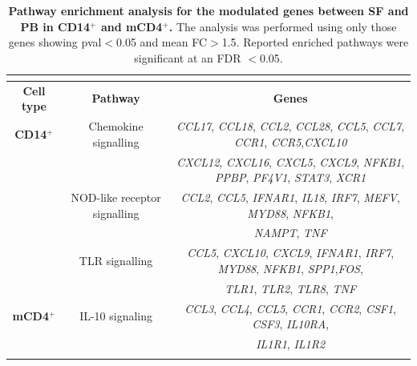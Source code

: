 \begin{landscape}
\begin{center}
\begin{longtable}[ht]{c c c }
\caption[Pathway enrichment analysis for the modulated genes between SF and PB in CD14$^+$ and mCD4$^+$.]{\textbf{Pathway enrichment analysis for the modulated genes between SF and PB in CD14$^+$ and mCD4$^+$.} The analysis was performed using only those genes showing pval$<$0.05 and mean FC$>$1.5. Reported enriched pathways were significant at an FDR $<$0.05.}
\\
\label{table:PSA_PCR_array_pathway_analysis} \\
\toprule
\textbf{Cell type} & \textbf{Pathway} & \textbf{Genes} \\						
\midrule
\midrule
\textbf{CD14$^+$} & Chemokine signalling & \textit{CCL17}, \textit{CCL18}, \textit{CCL2}, \textit{CCL28}, \textit{CCL5}, \textit{CCL7}, \textit{CCR1}, \textit{CCR5},\textit{CXCL10} \\  
									&                             & \textit{CXCL12}, \textit{CXCL16}, \textit{CXCL5}, \textit{CXCL9}, \textit{NFKB1}, \textit{PPBP}, \textit{PF4V1}, \textit{STAT3}, \textit{XCR1}\\
									
									& NOD-like receptor signalling & \textit{CCL2}, \textit{CCL5}, \textit{IFNAR1}, \textit{IL18}, \textit{IRF7}, \textit{MEFV}, \textit{MYD88}, \textit{NFKB1}, \\
									&                                         & \textit{NAMPT}, \textit{TNF} \\

									& TLR signalling   & \textit{CCL5}, \textit{CXCL10}, \textit{CXCL9}, \textit{IFNAR1}, \textit{IRF7}, \textit{MYD88}, \textit{NFKB1}, \textit{SPP1},\textit{FOS},\\ 
									&                                         & \textit{TLR1}, \textit{TLR2}, \textit{TLR8}, \textit{TNF}\\

\midrule
\textbf{mCD4$^+$} & IL-10 signaling & \textit{CCL3}, \textit{CCL4}, \textit{CCL5}, \textit{CCR1}, \textit{CCR2}, \textit{CSF1}, \textit{CSF3}, \textit{IL10RA}, \\
									&									& \textit{IL1R1}, \textit{IL1R2}\\
\bottomrule
\medskip
\end{longtable}
\end{center}
\end{landscape}

